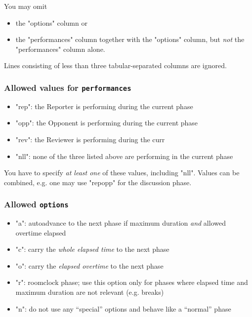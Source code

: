 \documentclass[11pt]{ltxdoc}
\begin{document}
    \medskip
    You may omit
    \begin{itemize}
        \item
            the "options" column or
        \item
            the "performances" column together with the "options" column, but \textit{not} the "performances" column alone.
    \end{itemize}
    
    \smallskip
    Lines consisting of less than three tabular-separated columns are ignored.

    
    \subsubsection*{Allowed values for \texttt{performances}}
    \begin{itemize}
        \item "rep": the Reporter is performing during the current phase
        \item "opp": the Opponent is performing during the current phase
        \item "rev": the Reviewer is performing during the curr
        \item "nll": none of the three listed above are performing in the current phase
    \end{itemize}

    You have to specify \textit{at least one} of these values, including "nll". Values can be combined, e.g. one may use "repopp" for the discussion phase.

    \subsubsection*{Allowed \texttt{options}}
    \begin{itemize}
        \item "a": autoadvance to the next phase if maximum duration \textit{and} allowed overtime elapsed
        \item "c": carry the \textit{whole elapsed time} to the next phase
        \item "o": carry the \textit{elapsed overtime} to the next phase
        \item "r": roomclock phase; use this option only for phases where elapsed time and maximum duration are not relevant (e.g. breaks)
        \item "n": do not use any \enquote{special} options and behave like a \enquote{normal} phase
    \end{itemize}
\end{document}
